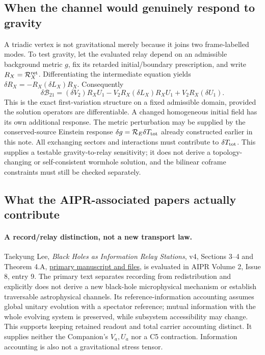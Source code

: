 \documentclass[11pt,a4paper]{article}
\begin{document}
\subsection{When the channel would genuinely respond to gravity}

A triadic vertex is not gravitational merely because it joins two
frame-labelled modes. To test gravity, let the evaluated relay
depend on an admissible background metric $g$, fix its retarded
initial/boundary prescription, and write $R_X=\mathcal R_X^{\rm ret}$.
Differentiating the intermediate equation yields
$\delta R_X=-R_X(\delta L_X)R_X$. Consequently
\[
 \delta\mathcal B_{21}
 = (\delta V_2)R_XU_1
 -V_2R_X(\delta L_X)R_XU_1
 +V_2R_X(\delta U_1).
\]
This is the exact first-variation structure on a fixed admissible
domain, provided the solution operators are differentiable.
A changed homogeneous initial field has its own additional response.
The metric perturbation may be supplied by the conserved-source
Einstein response $\delta g=\mathcal R_E\delta T_{\rm tot}$
already constructed earlier in this note. All exchanging sectors
and interactions must contribute to $\delta T_{\rm tot}$.
This supplies a testable gravity-to-relay sensitivity; it does not
derive a topology-changing or self-consistent wormhole solution,
and the bilinear coframe constraints must still be checked separately.

\subsection{What the AIPR-associated papers actually contribute}

\paragraph{A record/relay distinction, not a new transport law.}
Taekyung Lee, \emph{Black Holes as Information Relay Stations}, v4,
Sections 3--4 and Theorem 4.A,
\href{https://zenodo.org/records/20251654}{primary manuscript and files},
is evaluated in AIPR Volume 2, Issue 8, entry 9. The primary text
separates recording from redistribution and explicitly does not
derive a new black-hole microphysical mechanism or establish
traversable astrophysical channels. Its reference-information
accounting assumes global unitary evolution with a spectator
reference; mutual information with the whole evolving system is
preserved, while subsystem accessibility may change. This supports
keeping retained readout and total carrier accounting distinct.
It supplies neither the Companion's $V_a,U_a$ nor a C5 contraction.
Information accounting is also not a gravitational stress tensor.
\end{document}
